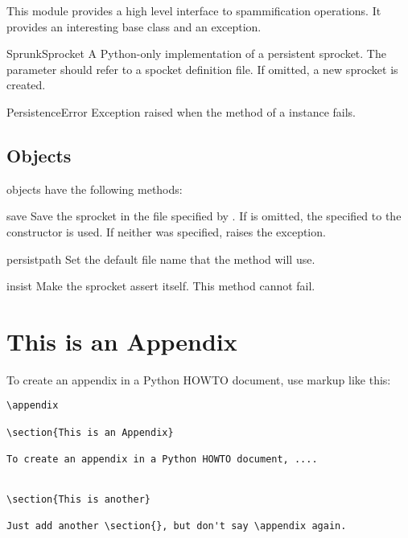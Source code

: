 \documentclass{howto}
\begin{document}
This module provides a high level interface to spammification
operations.  It provides an interesting base class and an exception.

\begin{classdesc}{SprunkSprocket}{}
A Python-only implementation of a persistent sprocket.  The  
parameter should refer to a spocket definition file.  If omitted, a
new sprocket is created.
\end{classdesc}

\begin{excdesc}{PersistenceError}
Exception raised when the  method of a
 instance fails.
\end{excdesc}


\subsection{ Objects}

 objects have the following methods:

\begin{funcdesc}{save}{}
Save the sprocket in the file specified by .  If 
is omitted, the  specified to the constructor is used.  If
neither was specified, raises the 
exception.
\end{funcdesc}


\begin{funcdesc}{persist}{path}
Set the default file name that the  method will use.
\end{funcdesc}


\begin{funcdesc}{insist}{}
Make the sprocket assert itself.  This method cannot fail.
\end{funcdesc}


\appendix

\section{This is an Appendix}

To create an appendix in a Python HOWTO document, use markup like
this:

\begin{verbatim}
\appendix

\section{This is an Appendix}

To create an appendix in a Python HOWTO document, ....


\section{This is another}

Just add another \section{}, but don't say \appendix again.
\end{verbatim}
\end{document}
